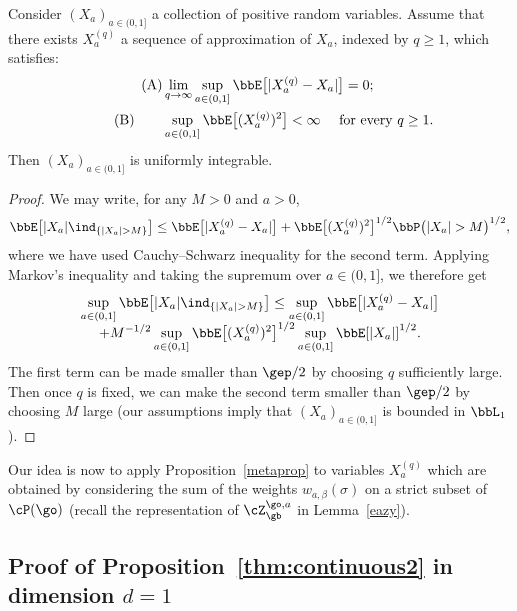 \begin{proposition}\label{metaprop}
Consider $(X_a)_{a\in (0,1]}$ a collection of positive random variables.
Assume that there exists
$X^{(q)}_a$ a sequence of approximation of $X_a$, indexed by $q\ge 1$, which satisfies:
\begin{align*}
\tag{A} & \lim_{q\to \infty} \sup_{a\in(0,1]} \bbE\bigl[ |X^{(q)}_a-X_a|\bigr]=0; \\
\tag{B} \qquad & \sup_{a\in(0,1]} \bbE\bigl[ (X^{(q)}_a)^2\bigr]<\infty \quad \text{ for every $q\geq 1$}.
\end{align*}
Then $(X_a)_{a\in(0,1]}$ is uniformly integrable.
\end{proposition}

\begin{proof}
We may write, for any $M>0$ and $a>0$,
\begin{align*}
\bbE\bigl[ |X_a| \ind_{\{|X_a|>M\}} \bigr] \leq \bbE\bigl[ |X^{(q)}_a-X_a| \bigr] +
\bbE\bigl[ (X^{(q)}_a)^2\bigr]^{1/2} \bbP\bigl(|X_a|>M \bigr)^{1/2},
\end{align*}
where we have used Cauchy--Schwarz inequality for the second term.
Applying Markov's inequality and taking the supremum over $a\in(0,1]$,
we therefore get\vspace*{-5pt}
\begin{multline*}
\sup_{a\in(0,1]} \bbE\bigl[ |X_a| \ind_{\{|X_a|>M\}} \bigr]
\leq \sup_{a\in(0,1]} \bbE\bigl[ |X^{(q)}_a-X_a| \bigr] \\[-5pt]
+ M^{-1/2} \sup_{a\in(0,1]}\bbE\bigl[ (X^{(q)}_a)^2\bigr]^{1/2} \sup_{a\in(0,1]} \bbE[|X_a|]^{1/2}.
\end{multline*}
The first term can be made smaller than $\gep/2$ by choosing $q$ sufficiently large. Then once $q$ is fixed, we can make the second term smaller than $\gep/2$ by choosing $M$ large (our assumptions imply that $(X_a)_{a\in(0,1]}$ is bounded in $\bbL_1$).
\end{proof}

Our idea is now to apply Proposition~\ref{metaprop} to variables $X^{(q)}_a$ which are obtained by considering the sum of the weights $w_{a,\beta}(\sigma)$ on a strict subset of $\cP(\go)$ (recall the representation of $\cZ_{\gb}^{\go,a}$ in Lemma~\ref{eazy}).

\subsection{Proof of Proposition~\ref{thm:continuous2} in dimension $d=1$}
\label{sec:dim1}

